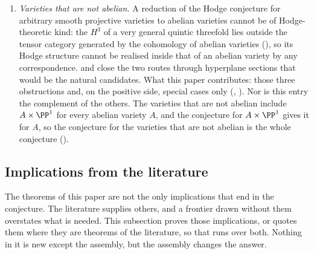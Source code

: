 \begin{enumerate}[label=\textup{(C\arabic*)},leftmargin=3.0em,itemsep=4pt]
  (). So the Hodge conjecture for abelian varieties
  does not reduce to Weil classes, and the statement needed is the
  algebraicity of these classes themselves. What this paper contributes: the
  example, made exact, and the forms of their algebraicity studied in
  .
\item \emph{Varieties that are not abelian.} A reduction of the Hodge
  conjecture for arbitrary smooth projective varieties to abelian varieties
  cannot be of Hodge-theoretic kind: the $H^{3}$ of a very
  general quintic threefold lies outside the tensor category generated by the
  cohomology of abelian varieties (), so its Hodge
  structure cannot be realised inside that of an abelian variety by any
  correspondence. \cite[Theorem~10.3]{paperI} and \cite[Theorem~10.8]{paperI} close the
  two routes through hyperplane sections that would be the natural candidates.
  What this paper contributes: those three obstructions and, on the positive
  side, special cases only (,
  ). Nor is this entry the complement of the others. The varieties
  that are not abelian include $A\times\PP^{1}$ for every abelian variety
  $A$, and the
  conjecture for $A\times\PP^{1}$ gives it for $A$, so the conjecture for
  the varieties that are not abelian is the whole conjecture
  ().
\end{enumerate}

\subsection{Implications from the literature}\label{ssec:bullseye}

The theorems of this paper are not the only implications that end in the
conjecture. The literature supplies others, and a frontier drawn without
them overstates what is needed. This subsection proves those implications, or
quotes them where they are theorems of the literature, so that
 runs over both. Nothing in it is new
except the assembly, but the assembly changes the answer.

